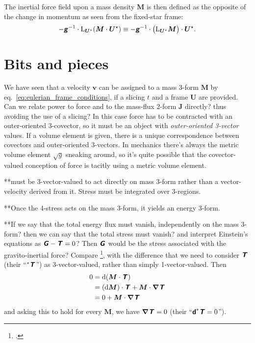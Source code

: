 \documentclass[\ifafour a4paper,12pt,\else a5paper,10pt,\fi%
onecolumn,oneside,article,%
british%
]{memoir}
\theoremstyle{remark}
\theoremstyle{innote}
\newcommand*{\mathte}[1]{\textbf{\textit{\textsf{#1}}}}
\newcommand*{\citep}{\footcites}
\newcommand*{\di}{\mathrm{d}}%
\renewcommand*{\|}[1][]{\nonscript\,#1\vert\nonscript\;\mathopen{}}
\newcommand*{\chap}{ch.}%
\newcommand*{\eqn}{eq.}%
\newcommand*{\Li}{\mathrm{L}}
\newcommand*{\yrr}{M}
\newcommand*{\yr}{\bm{\yrr}}
\newcommand*{\yjj}{J}
\newcommand*{\yj}{\bm{\yjj}}
\newcommand*{\yGG}{G}
\newcommand*{\yG}{\mathte{\yGG}}
\newcommand*{\yTTf}{T}
\newcommand*{\yTf}{\mathte{\yTTf}}
\newcommand*{\yvvt}{v}
\newcommand*{\yvt}{\bm{\yvvt}}
\newcommand*{\yFF}{U}
\newcommand*{\yF}{\bm{\yFF}}
\newcommand*{\yFi}{\yF^{\mathord{\star}}}
\newcommand*{\ygg}{g}
\newcommand*{\yg}{\mathte{\ygg}}
\newcommand*{\ygv}{\sqrt{\ygg}}
\newcommand*{\yDi}{\bm{\nabla}}
\begin{document}
The inertial force field upon a mass density $\yr$ is then defined as the
opposite of the change in momentum as seen from the fixed-star frame:
\begin{equation}
  \label{eq:inertial_force_fixed-stars}
  -\yg^{-1} \cdot \Li_{\yFi}(\yr\cdot\yFi) \equiv
  -\yg^{-1} \cdot \bigl(\Li_{\yFi}\yr\bigr)\cdot\yFi.
\end{equation}

\section{Bits and pieces}
\label{sec:bits}




We have seen that a velocity $\yvt$ can be
assigned to a mass 3-form $\yr$ by
\eqn~\eqref{eq:eulerian_frame_conditions}, if a slicing $t$ and a frame
$\yF$ are provided. Can we relate power to force and to the mass-flux
2-form $\yj$ directly? thus avoiding the use of a slicing? In this case
force has to be contracted with an outer-oriented 3-covector, so it must be
an object with \emph{outer-oriented 3-vector} values. If a volume element
is given, there is a unique correspondence between covectors and
outer-oriented 3-vectors. In mechanics there's always the metric volume
element $\ygv$ sneaking around, so it's quite possible that the
covector-valued conception of force is tacitly using a metric volume
element.


**must be 3-vector-valued to act directly on mass 3-form rather than a
vector-velocity derived from it. Stress must be integrated over 3-regions.

**Once the 4-stress acts on the mass 3-form, it yields an energy 3-form.

**If we say that the total energy flux must vanish, independently on the
mass 3-form? then we can say that the total stress must vanish? and
interpret Einstein's equations as $\yG-\yTf = 0$? Then $\yG$ would be the
stress associated with the gravito-inertial force? Compare
\citep[\chap~15]{misneretal1970_r1973}, with the difference that we need to
consider $\yTf$ (their \enquote{$^*\yTf$}) as
3-vector-valued, rather than simply 1-vector-valued. Then
\begin{equation}
  \label{eq:why_4stress_zero}
  \begin{split}
    0 &=   \di(\yr \cdot \yTf) \\
    &= (\di\yr)\cdot\yTf + \yr \cdot \yDi\yTf \\
    &= 0 + \yr \cdot \yDi\yTf
  \end{split}
\end{equation}
and asking this to hold for every $\yr$, we have $\yDi\yTf = 0$ (their
\enquote{$\bm{\mathsf{d}}^*\yTf=0$}).
\end{document}
